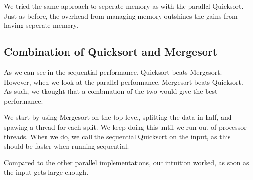 We tried the same approach to seperate memory as with the parallel Quicksort.
Just as before, the overhead from managing memory outshines the gains from
having seperate memory.

\subsection{Combination of Quicksort and Mergesort}
As we can see in the sequential performance, Quicksort beats Mergesort.
However, when we look at the parallel performance, Mergesort beats Quicksort.
As such, we thought that a combination of the two would give the best
performance.

We start by using Mergesort on the top level, splitting the data in half, and
spawing a thread for each split. We keep doing this until we run out of
processor threads. When we do, we call the sequential Quicksort on the input,
as this should be faster when running sequential.

Compared to the other parallel implementations, our intuition worked, as soon
as the input gets large enough.

